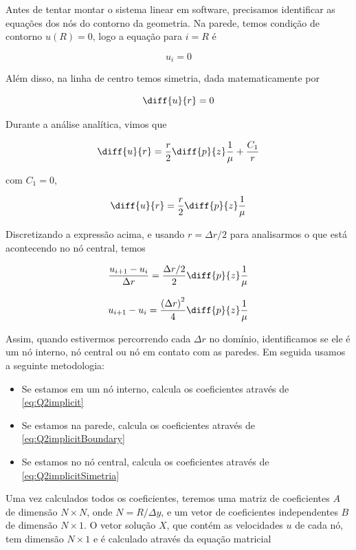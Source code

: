 Antes de tentar montar o sistema linear em software, precisamos identificar as equações dos nós do
contorno da geometria. Na parede, temos condição de contorno $u(R) = 0$, logo a equação para $i = R$ é

\begin{equation}\label{eq:Q2implicitBoundary}
    u_i = 0
\end{equation}

Além disso, na linha de centro temos simetria, dada matematicamente por

\[ \diff{u}{r} = 0 \]

Durante a análise analítica, vimos que

\[ \diff{u}{r} = \frac{r}{2} \diff{p}{z} \frac{1}{\mu} + \frac{C_1}{r} \]

\noindent com $C_1 = 0$,

\[ \diff{u}{r} = \frac{r}{2} \diff{p}{z} \frac{1}{\mu} \]

Discretizando a expressão acima, e usando $r = \Delta r / 2$ para analisarmos
o que está acontecendo no nó central, temos

\[ \frac{u_{i+1} - u_i}{\Delta r} = \frac{\Delta r / 2}{2} \diff{p}{z} \frac{1}{\mu} \]

\begin{equation}\label{eq:Q2implicitSimetria}
    u_{i+1} - u_i = \frac{\left(\Delta r\right)^2}{4} \diff{p}{z} \frac{1}{\mu}
\end{equation}

Assim, quando estivermos percorrendo cada $\Delta r$ no domínio, identificamos se ele é um nó interno, nó central ou
nó em contato com as paredes. Em seguida usamos a seguinte metodologia:

\begin{itemize}
    \item Se estamos em um nó interno, calcula os coeficientes através de \eqref{eq:Q2implicit}
    \item Se estamos na parede, calcula os coeficientes através de \eqref{eq:Q2implicitBoundary}
    \item Se estamos no nó central, calcula os coeficientes através de \eqref{eq:Q2implicitSimetria}
\end{itemize}

Uma vez calculados todos os coeficientes, teremos uma matriz de coeficientes $A$ de dimensão $N \times N$, onde
$N = R / \Delta y$, e um vetor de coeficientes independentes $B$ de dimensão $N \times 1$.
O vetor solução $X$, que contém as velocidades $u$ de cada nó, tem dimensão $N \times 1$ e é calculado através da
equação matricial

